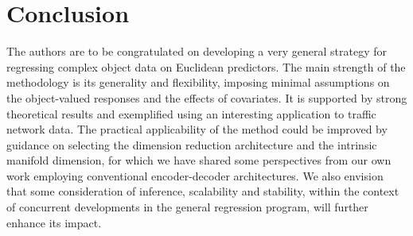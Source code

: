 \section{Conclusion}

The authors are to be congratulated on developing a very general strategy for regressing complex object data on Euclidean predictors. 
The main strength of the methodology is its generality and flexibility, imposing minimal assumptions on the object-valued responses and the effects of covariates. 
It is supported by strong theoretical results and exemplified using an interesting application to traffic network data.
The practical applicability of the method could be improved by guidance on selecting the dimension reduction architecture and the intrinsic manifold dimension, for which we have shared some perspectives from our own work employing conventional encoder-decoder architectures.
We also envision that some consideration of inference, scalability and stability, within the context of concurrent developments in the general \Frechet regression program, will further enhance its impact.